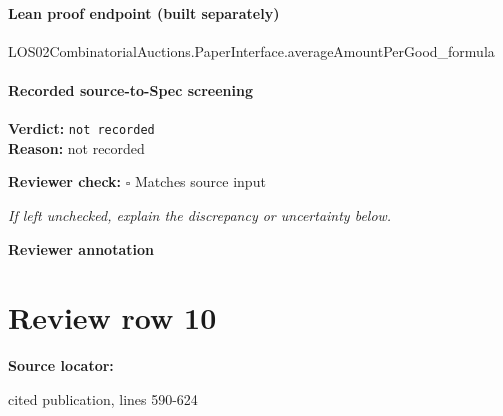 \documentclass[10pt]{article}
\newcommand{\reviewerbox}{%
  \par\noindent\fbox{\parbox{0.96\linewidth}{\rule{0pt}{0.38in}}}\par
}
\newcommand{\reviewmatch}[1]{%
  \par\noindent\textbf{Reviewer check:} $\square$\; #1\par
  \noindent\emph{If left unchecked, explain the discrepancy or uncertainty below.}\par
}
\begin{document}
\paragraph{Lean proof endpoint (built separately)}\begin{ReviewVerbatim}
LOS02CombinatorialAuctions.PaperInterface.averageAmountPerGood_formula
\end{ReviewVerbatim}

\paragraph{Recorded source-to-Spec screening}
\textbf{Verdict:} \texttt{not recorded}
\\
\textbf{Reason:} not recorded
\reviewmatch{Matches source input}
\noindent\textbf{Reviewer annotation}\par
\reviewerbox
\clearpage
\hypertarget{source-claim-49512ac602bfb45d}{}
\section*{Review row 10}
\textbf{Source locator:} {\footnotesize\raggedright cited publication, lines 590-\allowbreak{}624\par}
\end{document}
